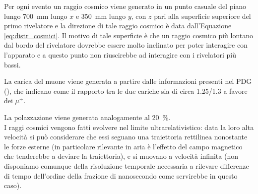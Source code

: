 Per ogni evento un raggio cosmico viene generato in un punto casuale del piano lungo \SI{700}{\mm} lungo $x$ e \SI{350}{\mm} lungo $y$, con $z$ pari alla superficie superiore del primo rivelatore e la direzione di tale raggio cosmico è data dall'Equazione \ref{eq:distr_cosmici}. Il motivo di tale superficie \`e che un raggio cosmico pi\`u lontano dal bordo del rivelatore dovrebbe essere molto inclinato per poter interagire con l'apparato e a questo punto non riuscirebbe ad interagire con i rivelatori pi\`u bassi.

La carica del muone viene generata a partire dalle informazioni presenti nel PDG (\cite{bib:Patrignani:2016xqp}), che indicano come il rapporto tra le due cariche sia di circa 1.25/1.3 a favore dei $\mu^+$.

La polazzazione viene generata analogamente al \SI{20}{\percent}.\\

I raggi cosmici vengono fatti evolvere nel limite ultrarelativistico: data la loro alta velocità si può considerare che essi seguano una traiettoria rettilinea nonostante
le forze esterne (in particolare rilevante in aria è l'effetto del campo magnetico che tenderebbe a deviare la traiettoria), e si muovano a velocità infinita (non disponiamo comunque della risoluzione temporale necessaria a rilevare differenze di tempo dell'ordine della frazione di nanosecondo come servirebbe in questo caso).

